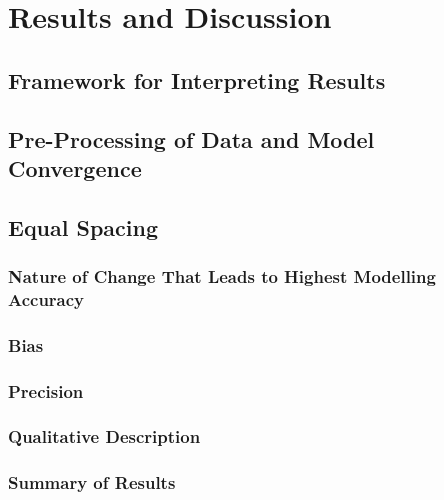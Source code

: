\documentclass[
12pt, %
twoside,
english]{guelphthesis}
\begin{document}
\hypertarget{results-and-discussion}{%
\section{Results and Discussion}\label{results-and-discussion}}

\hypertarget{framework-for-interpreting-results}{%
\subsection{Framework for Interpreting Results}\label{framework-for-interpreting-results}}

\hypertarget{pre-processing-of-data-and-model-convergence}{%
\subsection{Pre-Processing of Data and Model Convergence}\label{pre-processing-of-data-and-model-convergence}}

\hypertarget{concise-tab}{%
\subsection{Equal Spacing}\label{concise-tab}}

\hypertarget{nature-change-equal-exp1}{%
\subsubsection{Nature of Change That Leads to Highest Modelling Accuracy}\label{nature-change-equal-exp1}}

\hypertarget{bias-equal-exp1}{%
\subsubsection{Bias}\label{bias-equal-exp1}}

\hypertarget{precision-equal-exp1}{%
\subsubsection{Precision}\label{precision-equal-exp1}}

\hypertarget{qualitative-equal-exp1}{%
\subsubsection{Qualitative Description}\label{qualitative-equal-exp1}}

\hypertarget{summary-of-results}{%
\subsubsection{Summary of Results}\label{summary-of-results}}
\end{document}
